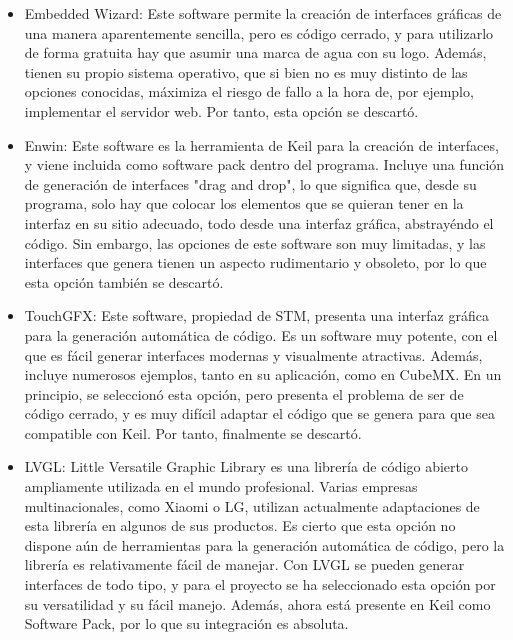 \begin{itemize}
  \item Embedded Wizard: Este software permite la creación de interfaces gráficas de una manera aparentemente sencilla, pero es código cerrado, y para utilizarlo de forma gratuita hay que asumir una marca de agua con su logo. Además, tienen su propio sistema operativo, que si bien no es muy distinto de las opciones conocidas, máximiza el riesgo de fallo a la hora de, por ejemplo, implementar el servidor web. Por tanto, esta opción se descartó.
  \item Enwin: Este software es la herramienta de Keil para la creación de interfaces, y viene incluida como software pack dentro del programa. Incluye una función de generación de interfaces "drag and drop", lo que significa que, desde su programa, solo hay que colocar los elementos que se quieran tener en la interfaz en su sitio adecuado, todo desde una interfaz gráfica, abstrayéndo el código. Sin embargo, las opciones de este software son muy limitadas, y las interfaces que genera tienen un aspecto rudimentario y obsoleto, por lo que esta opción también se descartó.
  \item TouchGFX: Este software, propiedad de STM, presenta una interfaz gráfica para la generación automática de código. Es un software muy potente, con el que es fácil generar interfaces modernas y visualmente atractivas. Además, incluye numerosos ejemplos, tanto en su aplicación, como en CubeMX. En un principio, se seleccionó esta opción, pero presenta el problema de ser de código cerrado, y es muy difícil adaptar el código que se genera para que sea compatible con Keil. Por tanto, finalmente se descartó.
  \item LVGL: Little Versatile Graphic Library es una librería de código abierto ampliamente utilizada en el mundo profesional. Varias empresas multinacionales, como Xiaomi o LG, utilizan actualmente adaptaciones de esta librería en algunos de sus productos. Es cierto que esta opción no dispone aún de herramientas para la generación automática de código, pero la librería es relativamente fácil de manejar. Con LVGL se pueden generar interfaces de todo tipo, y para el proyecto se ha seleccionado esta opción por su versatilidad y su fácil manejo. Además, ahora está presente en Keil como Software Pack, por lo que su integración es absoluta.
\end{itemize}
